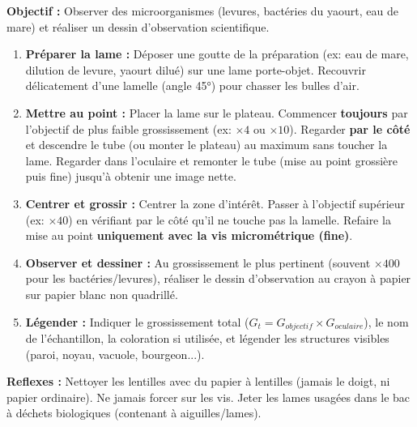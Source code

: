 \documentclass[11pt]{article}
\begin{document}
\begin{methode}
    \textbf{Objectif :} Observer des microorganismes (levures, bactéries du yaourt, eau de mare) et réaliser un dessin d'observation scientifique.
    \begin{enumerate}
        \item \textbf{Préparer la lame :} Déposer une goutte de la préparation (ex: eau de mare, dilution de levure, yaourt dilué) sur une lame porte-objet. Recouvrir délicatement d'une lamelle (angle 45°) pour chasser les bulles d'air.
        \item \textbf{Mettre au point :} Placer la lame sur le plateau. Commencer \textbf{toujours} par l'objectif de plus faible grossissement (ex: $\times 4$ ou $\times 10$). Regarder \textbf{par le côté} et descendre le tube (ou monter le plateau) au maximum sans toucher la lame. Regarder dans l'oculaire et remonter le tube (mise au point grossière puis fine) jusqu'à obtenir une image nette.
        \item \textbf{Centrer et grossir :} Centrer la zone d'intérêt. Passer à l'objectif supérieur (ex: $\times 40$) en vérifiant par le côté qu'il ne touche pas la lamelle. Refaire la mise au point \textbf{uniquement avec la vis micrométrique (fine)}.
        \item \textbf{Observer et dessiner :} Au grossissement le plus pertinent (souvent $\times 400$ pour les bactéries/levures), réaliser le dessin d'observation au crayon à papier sur papier blanc non quadrillé.
        \item \textbf{Légender :} Indiquer le grossissement total ($G_t = G_{objectif} \times G_{oculaire}$), le nom de l'échantillon, la coloration si utilisée, et légender les structures visibles (paroi, noyau, vacuole, bourgeon...).
    \end{enumerate}
    \textbf{Reflexes :} Nettoyer les lentilles avec du papier à lentilles (jamais le doigt, ni papier ordinaire). Ne jamais forcer sur les vis. Jeter les lames usagées dans le bac à déchets biologiques (contenant à aiguilles/lames).
\end{methode}
\end{document}
